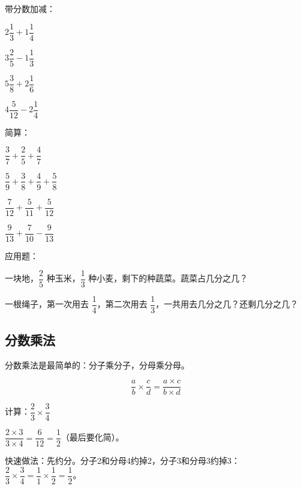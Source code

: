 \begin{exercise}
\item 带分数加减：
  \begin{subexercise}
    \item $2\dfrac{1}{3}+1\dfrac{1}{4}$
    \item $3\dfrac{2}{5}-1\dfrac{1}{3}$
    \item $5\dfrac{3}{8}+2\dfrac{1}{6}$
    \item $4\dfrac{5}{12}-2\dfrac{1}{4}$
  \end{subexercise}

\item 简算：
  \begin{subexercise}
    \item $\dfrac{3}{7}+\dfrac{2}{5}+\dfrac{4}{7}$
    \item $\dfrac{5}{9}+\dfrac{3}{8}+\dfrac{4}{9}+\dfrac{5}{8}$
    \item $\dfrac{7}{12}+\dfrac{5}{11}+\dfrac{5}{12}$
    \item $\dfrac{9}{13}+\dfrac{7}{10}-\dfrac{9}{13}$
  \end{subexercise}

\item 应用题：
  \begin{subexercise}
    \item 一块地，$\dfrac{2}{5}$ 种玉米，$\dfrac{1}{3}$ 种小麦，剩下的种蔬菜。蔬菜占几分之几？
    \item 一根绳子，第一次用去 $\dfrac{1}{4}$，第二次用去 $\dfrac{1}{3}$，一共用去几分之几？还剩几分之几？
  \end{subexercise}
\end{exercise}


\subsection*{分数乘法}

分数乘法是最简单的：分子乘分子，分母乘分母。

\[
\frac{a}{b}\times\frac{c}{d} = \frac{a\times c}{b\times d}
\]

\begin{example}
计算：$\dfrac{2}{3}\times\dfrac{3}{4}$
\end{example}
\begin{solution}
$\dfrac{2\times3}{3\times4} = \dfrac{6}{12} = \dfrac{1}{2}$（最后要化简）。

快速做法：先约分。分子2和分母4约掉2，分子3和分母3约掉3：
$\dfrac{2}{3}\times\dfrac{3}{4} = \dfrac{1}{1}\times\dfrac{1}{2} = \dfrac{1}{2}$。
\end{solution}

